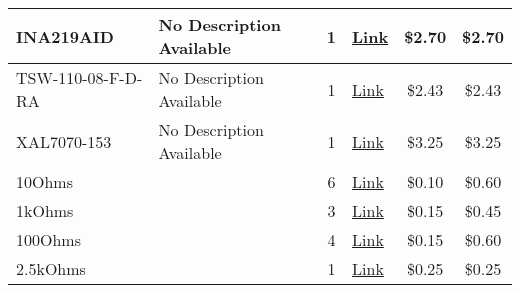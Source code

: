 \begin{xltabular}{\textwidth} {|X|X|c|X|c|c|}



    \hline
    INA219AID & No Description Available & 1 & \href{https://www.digikey.com/en/products/detail/texas-instruments/INA219AID/2047415}{Link} & \$2.70 & \$2.70 \\

    \hline
    TSW-110-08-F-D-RA & No Description Available & 1 & \href{https://www.digikey.com/en/products/detail/TSW-110-08-F-D-RA/SAM10352-ND/6679089?curr=usd\&utm_campaign=buynow\&utm_medium=aggregator\&utm_source=octopart}{Link} & \$2.43 & \$2.43 \\

    \hline
    XAL7070-153 & No Description Available & 1 & \href{https://www.coilcraft.com/en-us/products/power/shielded-inductors/molded-inductor/xal/xal7070/xal7070-153/}{Link} & \$3.25 & \$3.25 \\

    \hline
    10Ohms & & 6 & \href{https://www.mouser.com/ProductDetail/Panasonic/ERJ-3GEYJ100V?qs=66DK8nO8gJAjGcYWHht\%2FVw\%3D\%3D\&utm_id=177953176\&gad_source=1\&gclid=Cj0KCQjw0MexBhD3ARIsAEI3WHKrKkODpxPsv8Sk11XoQ9F2eJOY8cdxujn6ORDmm3D_U0FHH6x6uMoaAh5bEALw_wcB}{Link} & \$0.10 & \$0.60 \\

    \hline
    1kOhms & & 3 & \href{https://www.mouser.com/ProductDetail/Panasonic/ERJ-PA3F1001V?qs=gPaRPY8qCzMc40IhqxJeOQ\%3D\%3D\&utm_id=177953176\&gad_source=1\&gclid=Cj0KCQjw0MexBhD3ARIsAEI3WHK5iJyqcUCl9Si_ZGJNqQJbUBFLL_WoWEJ43XCjnAYT3Ko9kjddS1saAqqjEALw_wcB}{Link} & \$0.15 & \$0.45 \\

    \hline
    100Ohms & & 4 & \href{https://www.mouser.com/ProductDetail/Panasonic/ERJ-UP3J201V?qs=GedFDFLaBXFArcjGPzXiOQ\%3D\%3D}{Link} & \$0.15 & \$0.60 \\

    \hline
    2.5kOhms & & 1 & \href{https://www.mouser.com/ProductDetail/Panasonic/ERJ-PB3B2491V?qs=RYIBGgAklzIM7lNSKOU\%252Bzw\%3D\%3D}{Link} & \$0.25 & \$0.25 \\


\end{xltabular}

